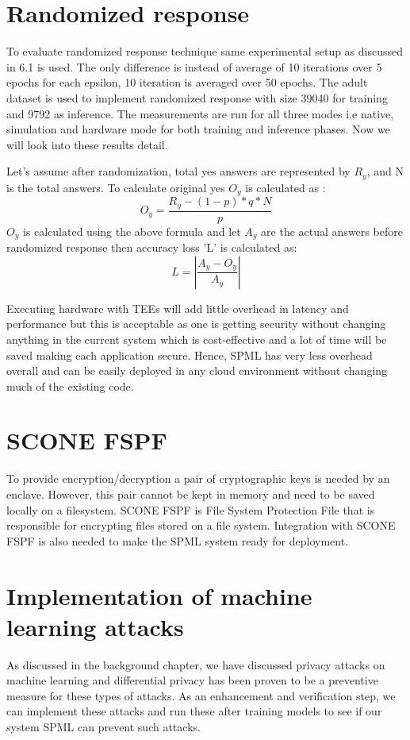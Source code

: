 \section{Randomized response}
To evaluate randomized response technique same experimental setup as discussed in 6.1 is used. The only difference is instead of average of 10 iterations over 5 epochs for each epsilon, 10 iteration is averaged over 50 epochs. The adult dataset \cite{15} is used to implement randomized response with size 39040 for training and 9792 as inference. The measurements are run for all three modes i.e native, simulation and hardware mode for both training and inference phases. Now we will look into these results detail.



Let's assume after randomization, total yes answers are represented by $R_y$, and N is the total answers. To calculate original yes $O_y$ is calculated as :
\begin{equation}
O_y = \frac{R_y - (1 - p) * q * N}{p}
\end{equation}
$O_y$ is calculated using the above formula and let $A_y$ are the actual answers before randomized response then accuracy loss 'L' is calculated as:
\begin{equation}
L = \left|{\frac{A_y-O_y}{A_y}}\right|
\end{equation}


Executing hardware with TEEs will add little overhead in latency and performance but this is acceptable as one is getting security without changing anything in the current system which is cost-effective and a lot of time will be saved making each application secure. Hence, SPML has very less overhead overall and can be easily deployed in any cloud environment without changing much of the existing code. 



\section{SCONE FSPF}
To provide encryption/decryption a pair of cryptographic keys is needed by an enclave. However, this pair cannot be kept in memory and need to be saved locally on a filesystem. SCONE FSPF is File System Protection File that is responsible for encrypting files stored on a file system. Integration with SCONE FSPF is also needed to make the SPML system ready for deployment.

\section{Implementation of machine learning attacks}
As discussed in the background chapter, we have discussed privacy attacks on machine learning and differential privacy has been proven to be a preventive measure for these types of attacks. As an enhancement and verification step, we can implement these attacks and run these after training models to see if our system SPML can prevent such attacks.

